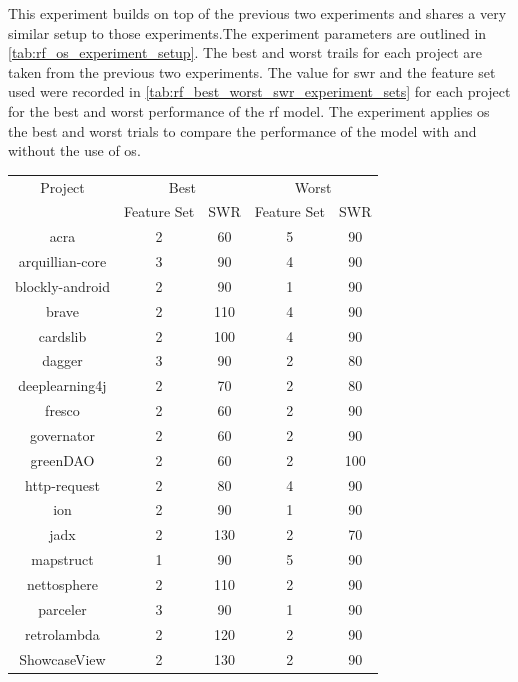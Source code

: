This experiment builds on top of the previous two experiments and shares a very similar setup to those experiments.The experiment parameters are outlined in \autoref{tab:rf_os_experiment_setup}. The best and worst trails for each project are taken from the previous two experiments. The value for \gls{swr} and the feature set used were recorded in \autoref{tab:rf_best_worst_swr_experiment_sets} for each project for the best and worst performance of the \gls{rf} model. The experiment applies \gls{os} the best and worst trials to compare the performance of the model with and without the use of \gls{os}.

\begin{table}[ht]
\begin{center}

    \begin{tabular}{|c|c|c|c|c|}
        \hline
        Project & \multicolumn{2}{c|}{Best} & \multicolumn{2}{c|}{Worst} \\ \cline{2-5}
         & Feature Set & SWR & Feature Set & SWR \\ 
        \hline
        acra & 2 & 60 & 5 & 90 \\
        arquillian-core & 3 & 90 & 4 & 90 \\
        blockly-android & 2 & 90 & 1 & 90 \\
        brave & 2 & 110 & 4 & 90 \\
        cardslib & 2 & 100 & 4 & 90 \\
        dagger & 3 & 90 & 2 & 80 \\
        deeplearning4j & 2 & 70 & 2 & 80 \\
        fresco & 2 & 60 & 2 & 90 \\
        governator & 2 & 60 & 2 & 90 \\
        greenDAO & 2 & 60 & 2 & 100 \\
        http-request & 2 & 80 & 4 & 90 \\
        ion & 2 & 90 & 1 & 90 \\
        jadx & 2 & 130 & 2 & 70 \\
        mapstruct & 1 & 90 & 5 & 90 \\
        nettosphere & 2 & 110 & 2 & 90 \\
        parceler & 3 & 90 & 1 & 90 \\
        retrolambda & 2 & 120 & 2 & 90 \\
        ShowcaseView & 2 & 130 & 2 & 90 \\

\end{tabular}
\end{center}
\end{table}
